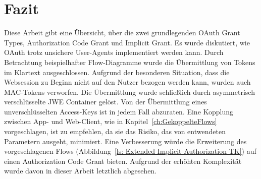 \chapter{Fazit}
Diese Arbeit gibt eine Übersicht, über die zwei grundlegenden OAuth Grant Types,
Authorization Code Grant und Implicit Grant. Es wurde diskutiert, wie OAuth
trotz unsichere User-Agents implementiert werden kann. Durch Betrachtung
beispielhafter Flow-Diagramme wurde die Übermittlung von Tokens im Klartext
ausgeschlossen. Aufgrund der besonderen Situation, dass die Websession zu Beginn
nicht auf den Nutzer bezogen werden kann, wurden auch MAC-Tokens verworfen. Die
Übermittlung wurde schließlich durch asymmetrisch verschlüsselte JWE Container
gelöst. Von der Übermittlung eines unverschlüsselten Access-Keys ist in jedem
Fall abzuraten. Eine Kopplung zwischen App- und Web-Client, wie in
Kapitel~\ref{ch:GekoppelteFlows} vorgeschlagen, ist zu empfehlen, da sie das
Risiko, das von entwendeten Parametern ausgeht, minimiert. Eine Verbesserung
würde die Erweiterung des vorgeschlagenen Flows (Abbildung~\ref{ls: Extended
Implicit Authorization TK}) auf einen Authorization Code Grant bieten. Aufgrund
der erhöhten Komplexität wurde davon in dieser Arbeit letztlich abgesehen.
